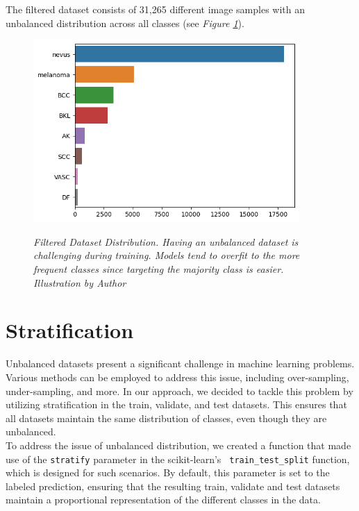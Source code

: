 The filtered dataset consists of 31,265 different image samples with an
unbalanced distribution across all classes (see \textit{Figure
\ref{fig:hole-dataset-distribution}}).

\begin{figure}[H]
  \centering
  \includegraphics[width=0.9\textwidth]{imatges/methodological_contribution/hole-dataset-diagnosis.png}
  \caption[Filtered Dataset Distribution]{\textit{Filtered Dataset Distribution. Having an unbalanced dataset is challenging during training. Models tend to overfit to the more frequent classes since targeting the majority class is easier. Illustration by Author}}
  {\label{fig:hole-dataset-distribution}}
\end{figure}

\section{Stratification}

Unbalanced datasets present a significant challenge in machine learning
problems. Various methods can be employed to address this issue, including
over-sampling, under-sampling, and more. In our approach, we decided to tackle
this problem by utilizing stratification in the train, validate, and test
datasets. This ensures that all datasets maintain the same distribution of
classes, even though they are unbalanced. \\

To address the issue of unbalanced distribution, we created a function that
made use of the {\tt stratify} parameter in the scikit-learn's {\tt
train\_test\_split} function, which is designed for such scenarios. By default,
this parameter is set to the labeled prediction, ensuring that the resulting
train, validate and test datasets maintain a proportional representation of the
different classes in the data.

